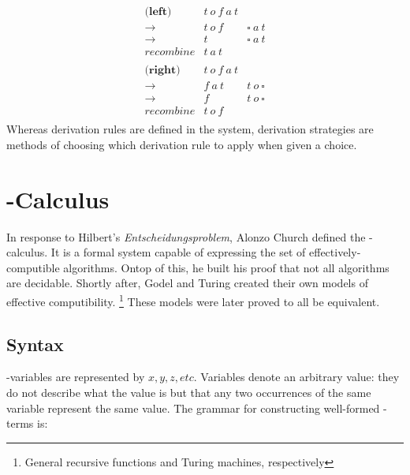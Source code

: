 \[
\begin{array}{rcl}
  
  \textbf{(left)} & t\ o\ f\ a\ t \\
  \to                & t\ o\ f & \square\ a\ t \\
  \to                & t       & \square\ a\ t \\
  \textit{recombine} & t\ a\ t & \\
  \\
  \textbf{(right)}   & t\ o\ f\ a\ t \\
  \to                & f\ a\ t & t\ o\ \square \\
  \to                & f       & t\ o\ \square \\
  \textit{recombine} & t\ o\ f & \\
  
\end{array}
\]
Whereas derivation rules are defined in the system, 
derivation strategies are methods of choosing which derivation rule to apply when given a choice. 

\section{\lam-Calculus}

In response to Hilbert's \emph{Entscheidungsproblem}, Alonzo Church
defined the \lam-calculus. It is a formal system capable of expressing
the set of effectively-computible algorithms. Ontop of this, he built
his proof that not all algorithms are decidable. Shortly after, Godel
and Turing created their own models of effective computibility.
\footnote{General recursive functions and Turing machines, respectively} 
These models were later proved to all be equivalent.

\subsection{Syntax}
  
  \lam-variables are represented by $x,y,z,etc$. Variables denote an
  arbitrary value: they do not describe what the value is but that any
  two occurrences of the same variable represent the same value. The
  grammar for constructing well-formed \lam-terms is:

  \begin{figure}[!h]
  \end{figure}

